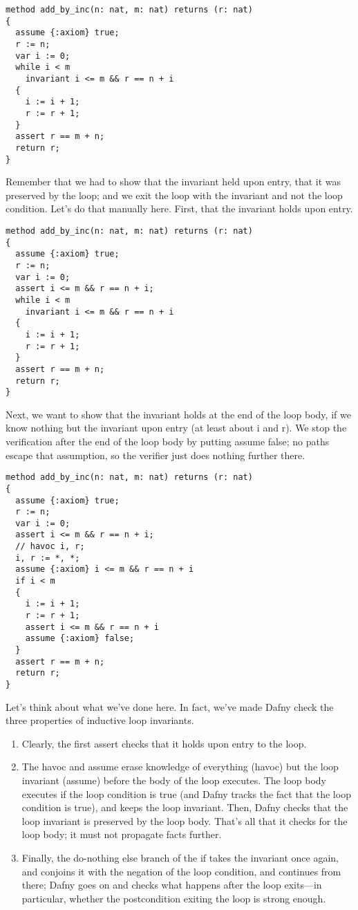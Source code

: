 \documentclass[11pt]{article}
\begin{document}
\begin{lstlisting}[language=dafny]
method add_by_inc(n: nat, m: nat) returns (r: nat)
{
  assume {:axiom} true;
  r := n;
  var i := 0;
  while i < m
    invariant i <= m && r == n + i
  {
    i := i + 1;
    r := r + 1;
  }
  assert r == m + n;
  return r;
}
\end{lstlisting}
Remember that we had to show that the invariant held upon entry, that it was preserved by the loop; and we
exit the loop with the invariant and not the loop condition. Let's do that manually here. First, that the invariant holds upon entry.
\begin{lstlisting}[language=dafny]
method add_by_inc(n: nat, m: nat) returns (r: nat)
{
  assume {:axiom} true;
  r := n;
  var i := 0;
  assert i <= m && r == n + i;
  while i < m
    invariant i <= m && r == n + i
  {
    i := i + 1;
    r := r + 1;
  }
  assert r == m + n;
  return r;
}
\end{lstlisting}
Next, we want to show that the invariant holds at the end of the loop body, if we know nothing but the invariant upon entry (at least about \textsf{i} and \textsf{r}).
We stop the verification after the end of the loop body by putting \textsf{assume false}; no paths escape that assumption, so the verifier just does nothing further there.
\begin{lstlisting}[language=dafny]
method add_by_inc(n: nat, m: nat) returns (r: nat)
{
  assume {:axiom} true;
  r := n;
  var i := 0;
  assert i <= m && r == n + i;
  // havoc i, r;
  i, r := *, *;
  assume {:axiom} i <= m && r == n + i
  if i < m
  {
    i := i + 1;
    r := r + 1;
    assert i <= m && r == n + i
    assume {:axiom} false;
  }
  assert r == m + n;
  return r;
}
\end{lstlisting}
Let's think about what we've done here. In fact, we've made Dafny
check the three properties of inductive loop invariants.
\begin{enumerate}[noitemsep] \item Clearly,
the first \textsf{assert} checks that it holds upon entry to the
loop.

\item The havoc and \textsf{assume} erase knowledge of everything (havoc)
but the loop invariant (\textsf{assume}) before the body of the loop executes. The loop
body executes if the loop condition is true (and Dafny tracks the fact that the loop condition is true),
and keeps the loop invariant. Then, Dafny checks that the loop
invariant is preserved by the loop body.  That's all that it checks
for the loop body; it must not propagate facts further.

\item   Finally,
the do-nothing else branch of the if takes the invariant once again,
and conjoins it with the negation of the loop condition, and continues
from there; Dafny goes on and checks what happens after the loop
exits---in particular, whether the postcondition exiting the loop is
strong enough.
\end{enumerate}
\end{document}
